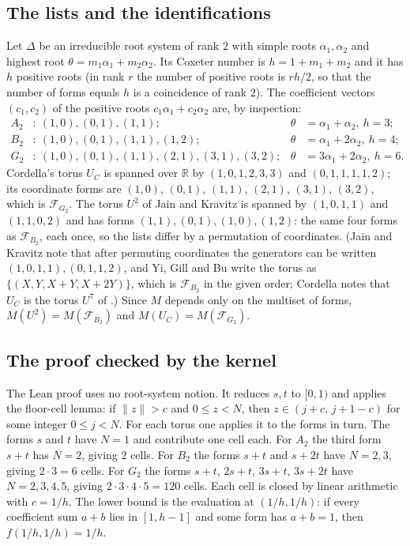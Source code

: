 \documentclass[11pt]{amsart}
\theoremstyle{definition}
\theoremstyle{remark}
\newcommand{\R}{\mathbb{R}}
\newcommand{\dist}[1]{\lVert #1\rVert}
\begin{document}
\subsection{The lists and the identifications}
Let $\Delta$ be an irreducible root system of rank $2$ with simple roots $\alpha_1,\alpha_2$ and highest root $\theta=m_1\alpha_1+m_2\alpha_2$. Its Coxeter number is $h=1+m_1+m_2$ and it has $h$ positive roots (in rank $r$ the number of positive roots is $rh/2$, so that the number of forms equals $h$ is a coincidence of rank $2$). The coefficient vectors $(c_1,c_2)$ of the positive roots $c_1\alpha_1+c_2\alpha_2$ are, by inspection:
\[
\begin{aligned}
A_2&:\ (1,0),(0,1),(1,1); & \theta&=\alpha_1+\alpha_2,\ h=3;\\
B_2&:\ (1,0),(0,1),(1,1),(1,2); & \theta&=\alpha_1+2\alpha_2,\ h=4;\\
G_2&:\ (1,0),(0,1),(1,1),(2,1),(3,1),(3,2); & \theta&=3\alpha_1+2\alpha_2,\ h=6.
\end{aligned}
\]
Cordella's torus $U_C$ is spanned over $\R$ by $(1,0,1,2,3,3)$ and $(0,1,1,1,1,2)$; its coordinate forms are $(1,0)$, $(0,1)$, $(1,1)$, $(2,1)$, $(3,1)$, $(3,2)$, which is $\mathcal F_{G_2}$. The torus $U^2$ of Jain and Kravitz is spanned by $(1,0,1,1)$ and $(1,1,0,2)$ and has forms $(1,1),(0,1),(1,0),(1,2)$: the same four forms as $\mathcal F_{B_2}$, each once, so the lists differ by a permutation of coordinates. (Jain and Kravitz note that after permuting coordinates the generators can be written $(1,0,1,1),(0,1,1,2)$, and Yi, Gill and Bu write the torus as $\{(X,Y,X+Y,X+2Y)\}$, which is $\mathcal F_{B_2}$ in the given order; Cordella notes that $U_C$ is the torus $U^7$ of \cite{JK}.) Since $M$ depends only on the multiset of forms, $M(U^2)=M(\mathcal F_{B_2})$ and $M(U_C)=M(\mathcal F_{G_2})$.

\subsection{The proof checked by the kernel}
The Lean proof uses no root-system notion. It reduces $s,t$ to $[0,1)$ and applies the floor-cell lemma: if $\dist z>c$ and $0\le z<N$, then $z\in(j+c,\,j+1-c)$ for some integer $0\le j<N$. For each torus one applies it to the forms in turn. The forms $s$ and $t$ have $N=1$ and contribute one cell each. For $A_2$ the third form $s+t$ has $N=2$, giving $2$ cells. For $B_2$ the forms $s+t$ and $s+2t$ have $N=2,3$, giving $2\cdot3=6$ cells. For $G_2$ the forms $s+t$, $2s+t$, $3s+t$, $3s+2t$ have $N=2,3,4,5$, giving $2\cdot3\cdot4\cdot5=120$ cells. Each cell is closed by linear arithmetic with $c=1/h$. The lower bound is the evaluation at $(1/h,1/h)$: if every coefficient sum $a+b$ lies in $[1,h-1]$ and some form has $a+b=1$, then $f(1/h,1/h)=1/h$.
\end{document}
